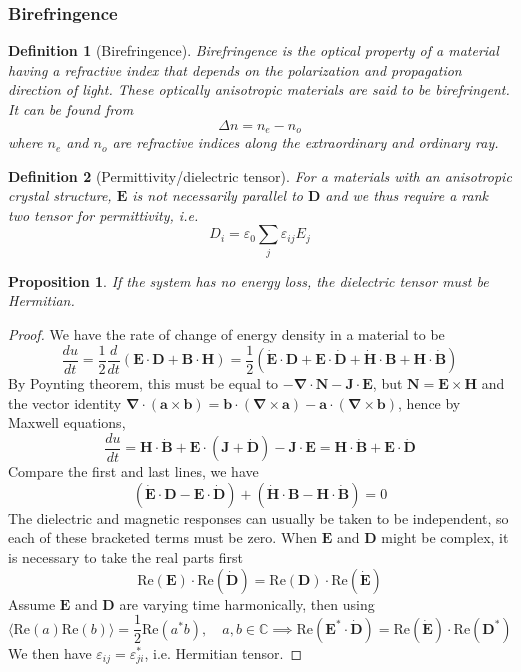 \documentclass[a4paper]{article}
\theoremstyle{new}
\newtheorem{defi}{Definition}[section]
\newtheorem{prop}{Proposition}[section]
\begin{document}
\subsubsection{Birefringence}
\begin{defi}[Birefringence]
Birefringence is the optical property of a material having a refractive index that depends on the polarization and propagation direction of light. These optically anisotropic materials are said to be birefringent. It can be found from
$$\Delta n=n_e-n_o$$
where $n_e$ and $n_o$ are refractive indices along the extraordinary and ordinary ray.
\end{defi}
\begin{defi}[Permittivity/dielectric tensor]
For a materials with an anisotropic crystal structure, $\mathbf{E}$ is not necessarily parallel to $\mathbf{D}$ and we thus require a rank two tensor for permittivity, i.e.
$$D_i=\varepsilon_0\sum_j\varepsilon_{ij}E_j$$
\end{defi}
\begin{prop}
If the system has no energy loss, the dielectric tensor must be Hermitian.
\end{prop}
\begin{proof}
We have the rate of change of energy density in a material to be
$$\frac{du}{dt}=\frac{1}{2}\frac{d}{dt}(\mathbf{E}\cdot\mathbf{D}+\mathbf{B}\cdot\mathbf{H})=\frac{1}{2}(\mathbf{\dot{E}}\cdot\mathbf{D}+\mathbf{E}\cdot\mathbf{\dot{D}}+\mathbf{\dot{H}}\cdot\mathbf{B}+\mathbf{H}\cdot\mathbf{\dot{B}})$$
By Poynting theorem, this must be equal to $-\boldsymbol{\nabla}\cdot\mathbf{N}-\mathbf{J}\cdot\mathbf{E}$, but $\mathbf{N}=\mathbf{E}\times\mathbf{H}$ and the vector identity $\boldsymbol{\nabla}\cdot(\mathbf{a}\times\mathbf{b})=\mathbf{b}\cdot(\boldsymbol{\nabla}\times\mathbf{a})-\mathbf{a}\cdot(\boldsymbol{\nabla}\times\mathbf{b})$, hence by Maxwell equations,
$$\frac{du}{dt}=\mathbf{H}\cdot\mathbf{\dot{B}}+\mathbf{E}\cdot(\mathbf{J}+\mathbf{\dot{D}})-\mathbf{J}\cdot\mathbf{E}=\mathbf{H}\cdot\mathbf{\dot{B}}+\mathbf{E}\cdot\mathbf{\dot{D}}$$
Compare the first and last lines, we have
$$(\mathbf{\dot{E}}\cdot\mathbf{D}-\mathbf{E}\cdot\mathbf{\dot{D}})+(\mathbf{\dot{H}}\cdot\mathbf{B}-\mathbf{H}\cdot\mathbf{\dot{B}})=0$$
The dielectric and magnetic responses can usually be taken to be independent, so each of these bracketed terms must be zero. When $\mathbf{E}$ and $\mathbf{D}$ might be complex, it is necessary to take the real parts first
$$\text{Re}(\mathbf{E})\cdot\text{Re}(\mathbf{\dot{D}})=\text{Re}(\mathbf{D})\cdot\text{Re}(\mathbf{\dot{E}})$$
Assume $\mathbf{E}$ and $\mathbf{D}$ are varying time harmonically, then using 
$$\langle\text{Re}(a)\text{Re}(b)\rangle=\frac{1}{2}\text{Re}(a^*b),\quad a,b\in\mathbb{C}\implies\text{Re}(\mathbf{E^*}\cdot\mathbf{\dot{D}})=\text{Re}(\mathbf{\dot{E}})\cdot\text{Re}(\mathbf{D^*})$$
We then have $\varepsilon_{ij}=\varepsilon_{ji}^*$, i.e. Hermitian tensor.
\end{proof}
\end{document}
